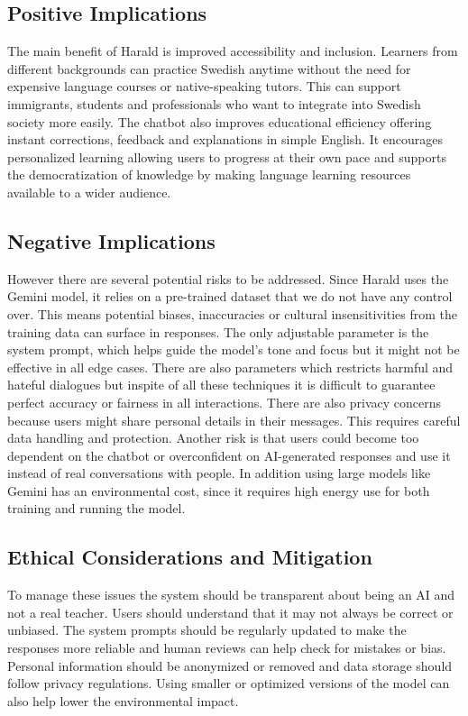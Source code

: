 \documentclass[a4paper,10pt]{article}
\begin{document}
\subsection{Positive Implications}
The main benefit of Harald is improved accessibility and inclusion. Learners from different backgrounds can practice Swedish anytime without the need for expensive language courses or native-speaking tutors. This can support immigrants, students and professionals who want to integrate into Swedish society more easily. The chatbot also improves educational efficiency offering instant corrections, feedback and explanations in simple English. It encourages personalized learning allowing users to progress at their own pace and supports the democratization of knowledge by making language learning resources available to a wider audience.

\subsection{Negative Implications}
However there are several potential risks to be addressed. Since Harald uses the Gemini model, it relies on a pre-trained dataset that we do not have any control over. This means potential biases, inaccuracies or cultural insensitivities from the training data can surface in responses. The only adjustable parameter is the system prompt, which helps guide the model’s tone and focus but it might not be effective in all edge cases. There are also parameters which restricts harmful and hateful dialogues but inspite of all these techniques it is difficult to guarantee perfect accuracy or fairness in all interactions. There are also privacy concerns because users might share personal details in their messages. This requires careful data handling and protection. Another risk is that users could become too dependent on the chatbot or overconfident on AI-generated responses and use it instead of real conversations with people. In addition using large models like Gemini has an environmental cost, since it requires high energy use for both training and running the model.

\subsection{Ethical Considerations and Mitigation}
To manage these issues the system should be transparent about being an AI and not a real teacher. Users should understand that it may not always be correct or unbiased. The system prompts should be regularly updated to make the responses more reliable and human reviews can help check for mistakes or bias. Personal information should be anonymized or removed and data storage should follow privacy regulations. Using smaller or optimized versions of the model can also help lower the environmental impact.
\end{document}
